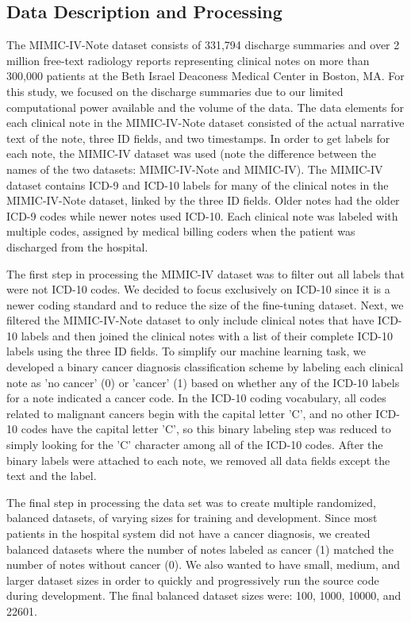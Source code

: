 \documentclass[manuscript,screen,review,nonacm]{acmart}
\begin{document}
\subsection{Data Description and Processing}
The MIMIC-IV-Note dataset consists of 331,794 discharge summaries and over 2 million free-text radiology reports representing clinical notes on more than 300,000 patients at the Beth Israel Deaconess Medical Center in Boston, MA. For this study, we focused on the discharge summaries due to our limited computational power available and the volume of the data. The data elements for each clinical note in the MIMIC-IV-Note dataset consisted of the actual narrative text of the note, three ID fields, and two timestamps\cite{dischnote}. In order to get labels for each note, the MIMIC-IV dataset\cite{johnson2023mimic} was used (note the difference between the names of the two datasets: MIMIC-IV-Note and MIMIC-IV). The MIMIC-IV dataset contains ICD-9 and ICD-10\cite{worldicd} labels for many of the clinical notes in the MIMIC-IV-Note dataset, linked by the three ID fields. Older notes had the older ICD-9 codes while newer notes used ICD-10. Each clinical note was labeled with multiple codes, assigned by medical billing coders when the patient was discharged from the hospital. 

The first step in processing the MIMIC-IV dataset was to filter out all labels that were not ICD-10 codes. We decided to focus exclusively on ICD-10 since it is a newer coding standard and to reduce the size of the fine-tuning dataset. Next, we filtered the MIMIC-IV-Note dataset to only include clinical notes that have ICD-10 labels and then joined the clinical notes with a list of their complete ICD-10 labels using the three ID fields. To simplify our machine learning task, we developed a binary cancer diagnosis classification scheme by labeling each clinical note as 'no cancer' (0) or 'cancer' (1) based on whether any of the ICD-10 labels for a note indicated a cancer code. In the ICD-10 coding vocabulary, all codes related to malignant cancers begin with the capital letter 'C', and no other ICD-10 codes have the capital letter 'C', so this binary labeling step was reduced to simply looking for the 'C' character among all of the ICD-10 codes. After the binary labels were attached to each note, we removed all data fields except the text and the label. 

The final step in processing the data set was to create multiple randomized, balanced datasets, of varying sizes for training and development. Since most patients in the hospital system did not have a cancer diagnosis, we created balanced datasets where the number of notes labeled as cancer (1) matched the number of notes without cancer (0). We also wanted to have small, medium, and larger dataset sizes in order to quickly and progressively run the source code during development. The final balanced dataset sizes were: 100, 1000, 10000, and 22601.
\end{document}
